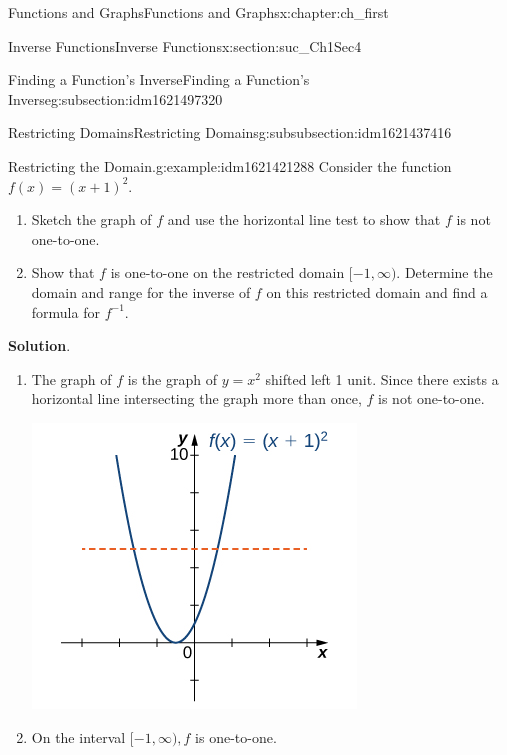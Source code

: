 \documentclass[oneside,10pt,]{book}
\newcommand{\blocktitlefont}{\relax}
\numberwithin{equation}{section}
\begin{document}
\begin{chapterptx}{Functions and Graphs}{}{Functions and Graphs}{}{}{x:chapter:ch_first}
\begin{sectionptx}{Inverse Functions}{}{Inverse Functions}{}{}{x:section:suc_Ch1Sec4}
\begin{subsectionptx}{Finding a Function’s Inverse}{}{Finding a Function’s Inverse}{}{}{g:subsection:idm1621497320}
\begin{subsubsectionptx}{Restricting Domains}{}{Restricting Domains}{}{}{g:subsubsection:idm1621437416}
\begin{example}{Restricting the Domain.}{g:example:idm1621421288}
Consider the function \(f(x)=(x+1)^2.\)%
%
\begin{enumerate}
\item{}Sketch the graph of \(f\) and use the horizontal line test to show that \(f\) is not one-to-one.%
\item{}Show that \(f\) is one-to-one on the restricted domain \([-1,\infty ).\) Determine the domain and range for the inverse of \(f\) on this restricted domain and find a formula for \(f^{-1} .\)%
\end{enumerate}
\par\smallskip%
\noindent\textbf{\blocktitlefont Solution}.\hypertarget{g:solution:idm1621420008}{}\quad{}%
\begin{enumerate}
\item{}The graph of \(f\) is the graph of \(y=x^2\) shifted left 1 unit. Since there exists a horizontal line intersecting the graph more than once, \(f\) is not one-to-one. \begin{image}{0.25}{0.5}{0.25}%
\includegraphics[width=\linewidth]{external/CNX_Calc_Figure_01_04_013.jpg}
\end{image}%
%
\item{}On the interval \([-1,\infty ), f\) is one-to-one. \begin{image}{0.25}{0.5}{0.25}%

\end{image}
\end{enumerate}
\end{example}
\end{subsubsectionptx}
\end{subsectionptx}
\end{sectionptx}
\end{chapterptx}
\end{document}
